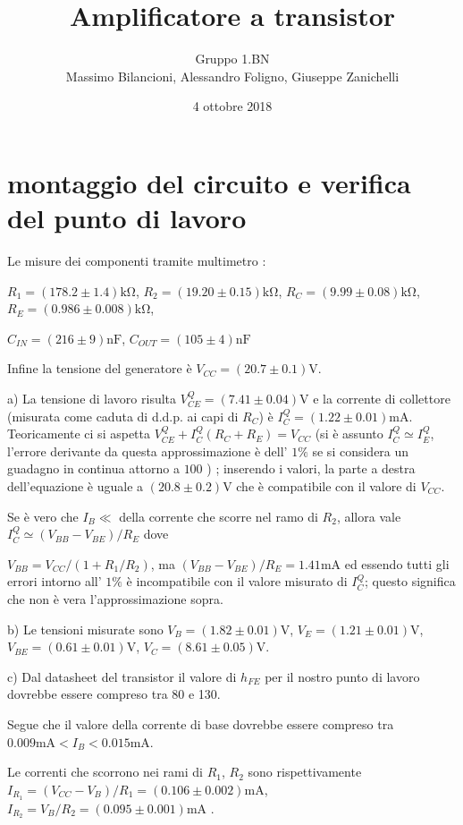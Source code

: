 \documentclass[10pt,a4paper]{article}
\author{Gruppo 1.BN \\ Massimo Bilancioni, Alessandro Foligno, Giuseppe Zanichelli }
\title{Amplificatore a transistor}
\begin{document}
\date{4 ottobre 2018}
\maketitle
\section{montaggio del circuito e verifica del punto di lavoro}

Le misure dei componenti tramite multimetro :

$ R_1 = (178.2\pm 1.4)\si{\kilo\ohm}$, $ R_2 = (19.20\pm 0.15)\si{\kilo\ohm}$, $ R_C = (9.99\pm 0.08)\si{\kilo\ohm}$, $ R_E = (0.986\pm 0.008)\si{\kilo\ohm}$,

 $ C_{IN} = (216 \pm 9)\si{\nano\farad}$, $ C_{OUT} = (105\pm 4)\si{\nano\farad}$

Infine la tensione del generatore è  $V_{CC} = (20.7\pm 0.1)\si{\volt}$.


a) La tensione  di lavoro risulta  $V_{CE}^Q = (7.41 \pm 0.04) \si{\volt}$ e  la corrente di collettore (misurata come caduta di d.d.p. ai capi di $R_C$) è $I_C^Q = (1.22\pm 0.01) \si{\milli\ampere}$. 
Teoricamente ci si aspetta  $V_{CE}^Q + I_C^Q(R_C+ R_E)= V_{CC}$  (si è assunto $I_C^Q \simeq I_E^Q$, l'errore derivante  da questa approssimazione è dell' $1 \%$ se si considera un guadagno in continua attorno a $100$ )
; inserendo i valori, la parte a destra dell'equazione è uguale a $(20.8\pm 0.2)\si{\volt}$ che è compatibile con il valore di $V_{CC}$.

Se è vero che  $I_B \ll$ della corrente che scorre nel ramo di $R_2$, allora vale $I_C^Q \simeq (V_{BB}-V_{BE})/R_E$ dove            

$V_{BB}= V_{CC}/(1+ R_1/R_2)$, ma $(V_{BB}-V_{BE})/R_E= 1.41 \si{\milli\ampere}$ ed essendo tutti gli errori intorno all' $1\%$ è incompatibile con il valore misurato di $I_C^Q$; questo significa che non è vera l'approssimazione sopra.


b) Le tensioni misurate sono $V_B = (1.82\pm 0.01)\si{\volt}$,  $V_E = (1.21\pm 0.01)\si{\volt}$,  $V_{BE} = (0.61\pm 0.01)\si{\volt}$,  $V_C = (8.61\pm 0.05)\si{\volt}$.

c) Dal datasheet del transistor il valore di $h_{FE}$ per il nostro punto di lavoro dovrebbe essere compreso tra 80 e 130.

Segue che il valore della corrente di base dovrebbe essere compreso tra $0.009\si{\milli\ampere} < I_B< 0.015\si{\milli\ampere} $.

Le correnti che scorrono nei rami di $R_1$, $R_2$ sono rispettivamente $I_{R_1} = (V_{CC}-V_{B})/R_1 = (0.106\pm 0.002)\si{\milli\ampere}  $, $I_{R_2} = V_{B}/R_2=(0.095\pm 0.001)\si{\milli\ampere} $ .
\end{document}
